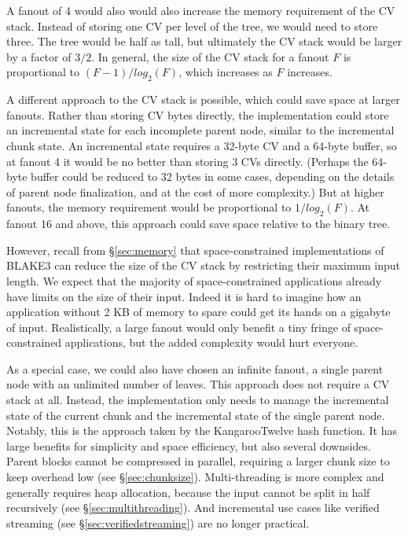 \documentclass[11pt,notitlepage,a4paper]{article}
\begin{document}
A fanout of 4 would also would also increase the memory requirement of the CV
stack. Instead of storing one CV per level of the tree, we would need to store
three. The tree would be half as tall, but ultimately the CV stack would be
larger by a factor of $3/2$. In general, the size of the CV stack for a fanout
$F$ is proportional to $(F-1)/log_2(F)$, which increases as $F$ increases.

A different approach to the CV stack is possible, which could save space at
larger fanouts. Rather than storing CV bytes directly, the implementation could
store an incremental state for each incomplete parent node, similar to the
incremental chunk state. An incremental state requires a 32-byte CV and a
64-byte buffer, so at fanout 4 it would be no better than storing 3 CVs
directly. (Perhaps the 64-byte buffer could be reduced to 32 bytes in some
cases, depending on the details of parent node finalization, and at the cost of
more complexity.) But at higher fanouts, the memory requirement would be
proportional to $1/log_2(F)$. At fanout 16 and above, this approach could save
space relative to the binary tree.

However, recall from \S\ref{sec:memory} that space-constrained implementations
of BLAKE3 can reduce the size of the CV stack by restricting their maximum
input length. We expect that the majority of space-constrained applications
already have limits on the size of their input. Indeed it is hard to imagine
how an application without 2 KB of memory to spare could get its hands on a
gigabyte of input. Realistically, a large fanout would only benefit a tiny
fringe of space-constrained applications, but the added complexity would hurt
everyone.

As a special case, we could also have chosen an infinite fanout, a single
parent node with an unlimited number of leaves. This approach does not require
a CV stack at all. Instead, the implementation only needs to manage the
incremental state of the current chunk and the incremental state of the single
parent node. Notably, this is the approach taken by the KangarooTwelve hash
function. It has large benefits for simplicity and space efficiency, but also
several downsides. Parent blocks cannot be compressed in parallel, requiring a
larger chunk size to keep overhead low (see \S\ref{sec:chunksize}).
Multi-threading is more complex and generally requires heap allocation, because
the input cannot be split in half recursively (see \S\ref{sec:multithreading}).
And incremental use cases like verified streaming (see
\S\ref{sec:verifiedstreaming}) are no longer practical.
\end{document}
